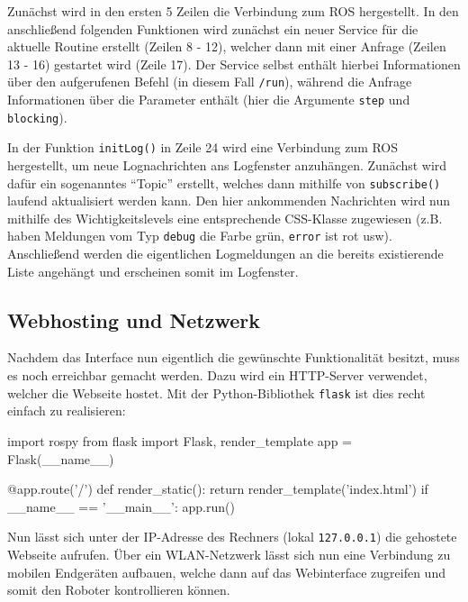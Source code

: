 Zunächst wird in den ersten 5 Zeilen die Verbindung zum ROS hergestellt. In den
anschließend folgenden Funktionen wird zunächst ein neuer Service für die aktuelle
Routine erstellt (Zeilen 8 - 12), welcher dann mit einer Anfrage (Zeilen 13 - 16)
gestartet wird (Zeile 17). Der Service selbst enthält hierbei Informationen über
den aufgerufenen Befehl (in diesem Fall \texttt{/run}), während die Anfrage Informationen
über die Parameter enthält (hier die Argumente \texttt{step} und \texttt{blocking}).

In der Funktion \texttt{initLog()} in Zeile 24 wird eine Verbindung zum ROS hergestellt,
um neue Lognachrichten ans Logfenster anzuhängen. Zunächst wird dafür ein sogenanntes
``Topic'' erstellt, welches dann mithilfe von \texttt{subscribe()} laufend aktualisiert
werden kann. Den hier ankommenden Nachrichten wird nun mithilfe des Wichtigkeitslevels
eine entsprechende CSS-Klasse zugewiesen (z.B. haben Meldungen vom Typ \textcolor[HTML]{006600}{\texttt{debug}}
die Farbe grün, \textcolor[HTML]{DD0000}{\texttt{error}} ist rot usw). Anschließend
werden die eigentlichen Logmeldungen an die bereits existierende Liste angehängt
und erscheinen somit im Logfenster.


\subsection{Webhosting und Netzwerk}
\label{subsec:webtools-remote-netzwerk}

Nachdem das Interface nun eigentlich die gewünschte Funktionalität besitzt, muss
es noch erreichbar gemacht werden. Dazu wird ein HTTP-Server verwendet, welcher
die Webseite hostet. Mit der Python-Bibliothek \texttt{flask} ist dies recht einfach
zu realisieren:

\begin{code}[language=python, caption={Python-Skript zum Hosten des Webservers}]
import rospy
from flask import Flask, render_template
app = Flask(__name__)

@app.route('/')
def render_static():
    return render_template('index.html')
if __name__ == '__main__':
    app.run()
\end{code}

Nun lässt sich unter der IP-Adresse des Rechners (lokal \texttt{127.0.0.1}) die
gehostete Webseite aufrufen. Über ein WLAN-Netzwerk lässt sich nun eine Verbindung
zu mobilen Endgeräten aufbauen, welche dann auf das Webinterface zugreifen und somit
den Roboter kontrollieren können.



